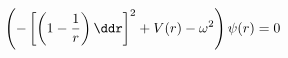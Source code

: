 \begin{equation} \label{de}
\left( - \left[ \left(1 - \frac{1}{r}\right) \ddr \right]^2 + V(r) - 
\omega^2 \right) \psi(r) = 0
\end{equation}

